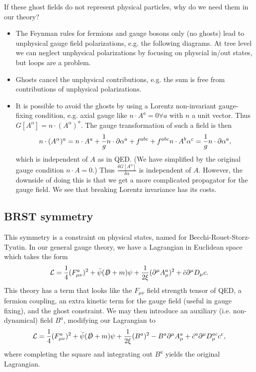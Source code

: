 If these ghost fields do not represent physical particles, why do we need them in our theory?
\begin{itemize}
    \item The Feynman rules for fermions and gauge bosons only (no ghosts) lead to unphysical gauge field polarizations, e.g. the following diagrams.
    At tree level we can neglect unphysical polarizations by focusing on physcial in/out states, but loops are a problem.
    \item Ghosts cancel the unphysical contributions, e.g. the sum
    is free from contributions of unphysical polarizations.
    \item It is possible to avoid the ghosts by using a Lorentz non-invariant gauge-fixing condition, e.g. axial gauge like $n\cdot A^a=0 \forall a$ with $n$ a unit vector. Thus $G[A^\alpha]=n\cdot (A^\alpha)^a$. The gauge transformation of such a field is then
    \begin{equation}
        n\cdot (A^\alpha)^a = n\cdot A^a +\frac{1}{g} n \cdot \partial \alpha^a +f^{abc} +f^{abc} n\cdot A^b \alpha^c =\frac{1}{g} n\cdot \partial \alpha^a,
    \end{equation}
    which is independent of $A$ as in QED. (We have simplified by the original gauge condition $n\cdot A=0$.)  Thus $\frac{\delta G[A^\alpha]}{\delta \alpha}$ is independent of $A$. However, the downside of doing this is that we get a more complicated propagator for the gauge field. We see that breaking Lorentz invariance has its costs.
\end{itemize}

\subsection*{BRST symmetry}
This symmetry is a constraint on physical states, named for Becchi-Rouet-Storz-Tyutin. In our general gauge theory, we have a Lagrangian in Euclidean space which takes the form
\begin{equation}
    \mathcal L=\frac{1}{4}(F^a_{\mu\nu})^2 +\bar \psi(\slashed{D}+m)\psi +\frac{1}{2\xi}(\partial^\mu A^a_\mu)^2 + \bar c \partial^\mu D_\mu c.
\end{equation}
This theory has a term that looks like the $F_{\mu\nu}$ field strength tensor of QED, a fermion coupling, an extra kinetic term for the gauge field (useful in gauge fixing), and the ghost constraint.
We may then introduce an auxiliary (i.e. non-dynamical) field $B^a$, modifying our Lagrangian to
\begin{equation}
    \mathcal L = \frac{1}{4}(F_{\mu\nu}^a)^2 + \bar \psi(\slashed{D} + m) \psi +\frac{1}{2\xi} (B^a)^2 -B^a \partial^\mu A_\mu^a  +\bar c^a \partial^\mu D_\mu^{ac} c^c,
\end{equation}
where completing the square and integrating out $B^a$ yields the original Lagrangian.

